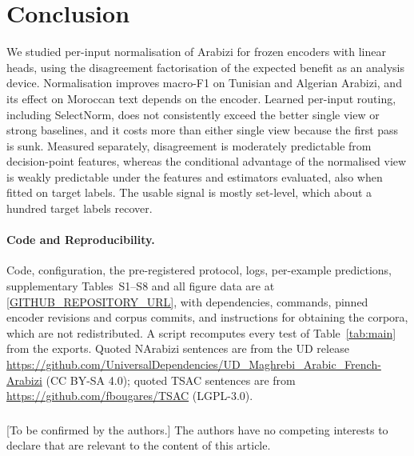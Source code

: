 \section{Conclusion}
\label{sec:conclusion}
We studied per-input normalisation of Arabizi for frozen encoders with linear heads, using the disagreement factorisation of the expected benefit as an analysis device. Normalisation improves macro-F1 on Tunisian and Algerian Arabizi, and its effect on Moroccan text depends on the encoder. Learned per-input routing, including SelectNorm, does not consistently exceed the better single view or strong baselines, and it costs more than either single view because the first pass is sunk. Measured separately, disagreement is moderately predictable from decision-point features, whereas the conditional advantage of the normalised view is weakly predictable under the features and estimators evaluated, also when fitted on target labels. The usable signal is mostly set-level, which about a hundred target labels recover.

\paragraph{Code and Reproducibility.}
Code, configuration, the pre-registered protocol, logs, per-example predictions, supplementary Tables~S1--S8 and all figure data are at \url{[GITHUB_REPOSITORY_URL]}, with dependencies, commands, pinned encoder revisions and corpus commits, and instructions for obtaining the corpora, which are not redistributed. A script recomputes every test of Table~\ref{tab:main} from the exports. Quoted NArabizi sentences are from the UD release \url{https://github.com/UniversalDependencies/UD_Maghrebi_Arabic_French-Arabizi} (CC BY-SA 4.0); quoted TSAC sentences are from \url{https://github.com/fbougares/TSAC} (LGPL-3.0).

\begin{credits}
\subsubsection{\discintname}
[To be confirmed by the authors.] The authors have no competing interests to declare that are relevant to the content of this article.
\end{credits}
